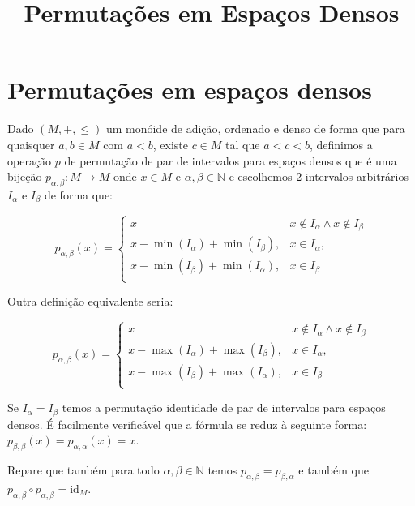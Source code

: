 \documentclass[12pt,a4paper]{article}
\title{Permutações em Espaços Densos}
\author{}
\date{}
\begin{document}
\maketitle

\section{Permutações em espaços densos}

Dado $(M, +, \leq)$ um monóide de adição, ordenado e denso de forma que para quaisquer $a,b \in M$ com $a<b$, existe $c \in M$ tal que $a < c < b$, definimos a operação $p$ de permutação de par de intervalos para espaços densos que é uma bijeção $p_{\alpha,\beta}: M \to M$ onde $x \in M$ e $\alpha,\beta \in \mathbb{N}$ e escolhemos 2 intervalos arbitrários $I_{\alpha}$ e $I_{\beta}$ de forma que:

\begin{equation}
 p_{\alpha,\beta}{(x)} = \begin{cases} 
    x & x \not\in I_{\alpha} \land x \not \in I_{\beta}\\
    x - \min(I_{\alpha}) + \min(I_{\beta}), & x \in I_{\alpha},\\
    x - \min(I_{\beta}) + \min(I_{\alpha}), & x \in I_{\beta}\\
\end{cases}
\end{equation}

Outra definição equivalente seria:

\begin{equation}
 p_{\alpha,\beta}{(x)} = \begin{cases} 
    x & x \not\in I_{\alpha}\land x \not \in I_\beta\\
    x - \max(I_{\alpha}) + \max(I_{\beta}), & x \in I_{\alpha},\\
    x - \max(I_{\beta}) + \max(I_{\alpha}), & x \in I_{\beta}\\
\end{cases}
\end{equation}

Se $I_{\alpha} = I_{\beta}$ temos a permutação identidade de par de intervalos para espaços densos. É facilmente verificável que a fórmula se reduz à seguinte forma: $p_{\beta,\beta}{(x)} = p_{\alpha,\alpha}{(x)} = x$.

Repare que também para todo $\alpha,\beta \in \mathbb{N}$ temos $p_{\alpha,\beta} = p_{\beta, \alpha}$ e também que $p_{\alpha,\beta} \circ p_{\alpha,\beta}= \text{id}_M$.
\end{document}
